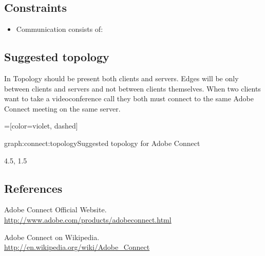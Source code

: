 \documentclass[a4paper]{report}
\begin{document}
\subsection{Constraints}

\begin{itemize}
\item Communication consists of:
\end{itemize}

\subsection{Suggested topology}

In Topology should be present both clients and servers. Edges will be only between clients and servers and not between clients themselves. When two clients want to take a videoconference call they both must connect to the same Adobe Connect meeting on the same server.

=[color=violet, dashed]

\begin{Graph}{graph:connect:topology}{Suggested topology for Adobe Connect}  

      
  
  \begin{GraphLegend}{4.5, 1.5}
  \end{GraphLegend}
\end{Graph}

\subsection{References}

\renewcommand{\bibsection}{}
\begin{thebibliography}{1}

Adobe Connect Official Website.
\\ \url{http://www.adobe.com/products/adobeconnect.html}

Adobe Connect on Wikipedia.
\\ \url{http://en.wikipedia.org/wiki/Adobe_Connect}

\end{thebibliography}
\end{document}
